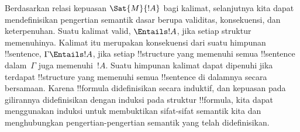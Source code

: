\documentclass[../../../include/open-logic-section]{subfiles}
\begin{document}
Berdasarkan relasi kepuasan $\Sat{M}{!A}$ bagi kalimat, selanjutnya kita dapat
mendefinisikan pengertian semantik dasar berupa validitas, konsekuensi, dan
keterpenuhan. Suatu kalimat valid, $\Entails !A$, jika setiap struktur
memenuhinya. Kalimat itu merupakan konsekuensi dari suatu himpunan
!!{sentence}, $\Gamma \Entails !A$, jika setiap !!{structure} yang memenuhi
semua !!{sentence} dalam~$\Gamma$ juga memenuhi~$!A$. Suatu himpunan kalimat
dapat dipenuhi jika terdapat !!{structure} yang memenuhi semua !!{sentence}
di dalamnya secara bersamaan. Karena !!{formula} didefinisikan secara
induktif, dan kepuasan pada gilirannya didefinisikan dengan induksi pada
struktur !!{formula}, kita dapat menggunakan induksi untuk membuktikan
sifat-sifat semantik kita dan menghubungkan pengertian-pengertian semantik
yang telah didefinisikan.
\end{document}
